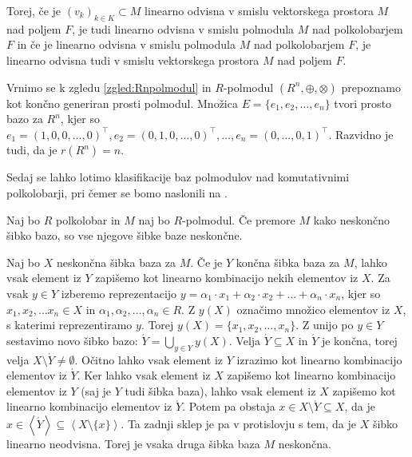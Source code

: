 \documentclass[mat1]{fmfdelo}
\newcommand{\Gen}[1]{\ensuremath{\left<{#1}\right>}}
\begin{document}
Torej, če je $(v_k)_{k\in K} \subset M$ linearno odvisna v smislu vektorskega prostora $M$ nad poljem $F$, je tudi linearno odvisna v smislu polmodula $M$ nad polkolobarjem $F$ in če je linearno odvisna v smislu polmodula $M$ nad polkolobarjem $F$, je linearno odvisna tudi v smislu vektorskega prostora $M$ nad poljem $F$.

\begin{zgled}
	Vrnimo se k zgledu \ref{zgled:Rnpolmodul} in $R$-polmodul $(R^n, \oplus, \otimes)$ prepoznamo kot končno generiran prosti polmodul. Množica $E = \{e_1, e_2, \ldots, e_n\}$ tvori prosto bazo za $R^n$, kjer so $e_1 = (1, 0, 0, \ldots, 0)^\top, e_2 = (0, 1, 0, \ldots, 0)^\top, \ldots, e_n = (0, \ldots, 0, 1)^\top$. Razvidno je tudi, da je $r(R^n) = n$.
\end{zgled}

Sedaj se lahko lotimo klasifikacije baz polmodulov nad komutativnimi polkolobarji, pri čemer se bomo naslonili na \cite[izrek 3.\ 1.]{bib:Tanbase}.

\begin{izrek}
	Naj bo $R$ polkolobar in $M$ naj bo $R$-polmodul. Če premore $M$ kako neskončno šibko bazo, so vse njegove šibke baze neskončne.
\end{izrek}
\begin{dokaz}
	Naj bo $X$ neskončna šibka baza za $M$. Če je $Y$ končna šibka baza za $M$, lahko vsak element iz $Y$ zapišemo kot linearno kombinacijo nekih elementov iz $X$. Za vsak $y\in Y$ izberemo reprezentacijo $y = \alpha_1\cdot x_1 + \alpha_2\cdot x_2 + \ldots + \alpha_n\cdot x_n$, kjer so $x_1, x_2, \ldots x_n \in X$ in $\alpha_1, \alpha_2, \ldots, \alpha_n \in R$. Z $y(X)$ označimo množico elementov iz $X$, s katerimi reprezentiramo $y$. Torej $y(X) = \{x_1, x_2, \ldots, x_n\}$. Z unijo po $y\in Y$ sestavimo novo šibko bazo: $\acute{Y} = \bigcup_{y\in Y}y(X)$. Velja $\acute{Y} \subseteq X$ in $\acute{Y}$ je končna, torej velja $X\setminus\acute{Y}\neq\emptyset$. Očitno lahko vsak element iz $Y$ izrazimo kot linearno kombinacijo elementov iz $\acute{Y}$. Ker lahko vsak element iz $X$ zapišemo kot linearno kombinacijo elementov iz $Y$ (saj je $Y$ tudi šibka baza), lahko vsak element iz $X$ zapišemo kot linearno kombinacijo elementov iz $\acute{Y}$. Potem pa obstaja $x\in X\setminus\acute{Y} \subseteq X$, da je $x\in \Gen{\acute{Y}}\subseteq\Gen{X\setminus\{x\}}$. Ta zadnji sklep je pa v protislovju s tem, da je $X$ šibko linearno neodvisna. Torej je vsaka druga šibka baza $M$ neskončna.
\end{dokaz}
\end{document}
